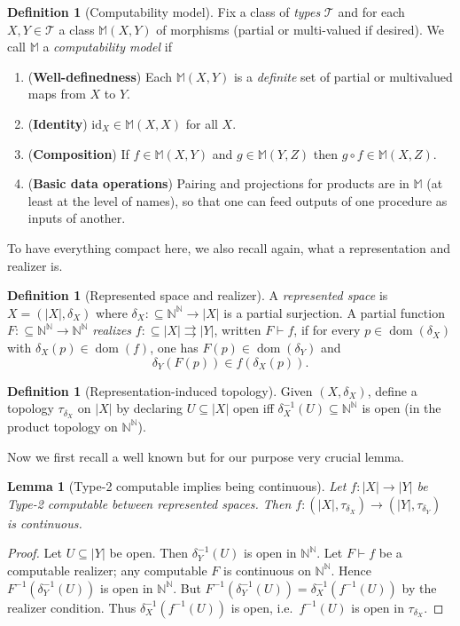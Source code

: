 \documentclass{lmcs} %
\theoremstyle{plain}
\theoremstyle{plain}
\newtheorem{lemma}[theorem]{Lemma}
\theoremstyle{definition}
\newtheorem{definition}[theorem]{Definition}
\theoremstyle{remark}
\theoremstyle{definition}
\theoremstyle{remark}
\numberwithin{equation}{section}
\newcommand{\N}{\mathbb{N}}
\newcommand{\Baire}{\N^\N}
\newcommand{\id}{\mathrm{id}}
\begin{document}
\begin{definition}[Computability model]\label{def:compmodel}
Fix a class of \textit{types} $\mathcal{T}$ and for each $X,Y\in\mathcal{T}$ a class $\mathbb{M}(X,Y)$
of morphisms (partial or multi-valued if desired).
We call $\mathbb{M}$ a \textit{computability model} if
\begin{enumerate}
\item (\textbf{Well-definedness}) Each $\mathbb{M}(X,Y)$ is a \textit{definite} set of partial or multivalued maps from $X$ to $Y$.
\item (\textbf{Identity}) $\id_X\in\mathbb{M}(X,X)$ for all $X$.
\item (\textbf{Composition}) If $f\in\mathbb{M}(X,Y)$ and $g\in\mathbb{M}(Y,Z)$ then $g\circ f\in\mathbb{M}(X,Z)$.
\item (\textbf{Basic data operations}) Pairing and projections for products are in $\mathbb{M}$ (at least at the level of names),
so that one can feed outputs of one procedure as inputs of another.
\end{enumerate}
\end{definition}

To have everything compact here, we also recall again, what a representation and realizer is.
\begin{definition}[Represented space and realizer]
A \textit{represented space} is $X=(|X|,\delta_X)$ where $\delta_X:\subseteq\Baire\to |X|$ is a partial surjection.
A partial function $F:\subseteq\Baire\to\Baire$ \textit{realizes} \(f:\subseteq |X|\rightrightarrows |Y|\), written \(F\vdash f\), if for every
\(p\in\operatorname{dom}(\delta_X)\) with \(\delta_X(p)\in\operatorname{dom}(f)\), one has \(F(p)\in\operatorname{dom}(\delta_Y)\) and
\[
        \delta_Y(F(p))\in f(\delta_X(p)).
\]
\end{definition}

\begin{definition}[Representation-induced topology]
Given $(X,\delta_X)$, define a topology $\tau_{\delta_X}$ on $|X|$ by declaring $U\subseteq |X|$ open iff
$\delta_X^{-1}(U)\subseteq\Baire$ is open (in the product topology on $\Baire$).
\end{definition}

Now we first recall a well known but for our purpose very crucial lemma.
\begin{lemma}[Type-2 computable implies being continuous]\label{lem:comp-implies-cont}
Let $f:|X|\to |Y|$ be Type-2 computable between represented spaces.
Then $f:(|X|,\tau_{\delta_X})\to(|Y|,\tau_{\delta_Y})$ is continuous.
\end{lemma}
\begin{proof}
Let $U\subseteq |Y|$ be open. Then $\delta_Y^{-1}(U)$ is open in $\Baire$.
Let $F\vdash f$ be a computable realizer; any computable $F$ is continuous on $\Baire$.
Hence $F^{-1}(\delta_Y^{-1}(U))$ is open in $\Baire$.
But $F^{-1}(\delta_Y^{-1}(U))=\delta_X^{-1}(f^{-1}(U))$ by the realizer condition.
Thus $\delta_X^{-1}(f^{-1}(U))$ is open, i.e.\ $f^{-1}(U)$ is open in $\tau_{\delta_X}$.
\end{proof}
\end{document}
